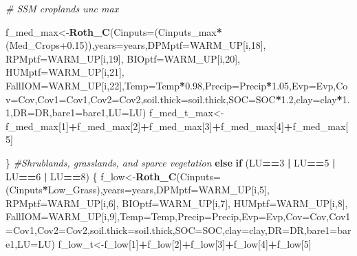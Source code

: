 \documentclass[
  10pt,
  b5paper,
]{book}
\newenvironment{Shaded}{\begin{snugshade}}{\end{snugshade}}
\newcommand{\CommentTok}[1]{\textcolor[rgb]{0.56,0.35,0.01}{\textit{#1}}}
\newcommand{\ControlFlowTok}[1]{\textcolor[rgb]{0.13,0.29,0.53}{\textbf{#1}}}
\newcommand{\DataTypeTok}[1]{\textcolor[rgb]{0.13,0.29,0.53}{#1}}
\newcommand{\DecValTok}[1]{\textcolor[rgb]{0.00,0.00,0.81}{#1}}
\newcommand{\FloatTok}[1]{\textcolor[rgb]{0.00,0.00,0.81}{#1}}
\newcommand{\KeywordTok}[1]{\textcolor[rgb]{0.13,0.29,0.53}{\textbf{#1}}}
\newcommand{\NormalTok}[1]{#1}
\newcommand{\OperatorTok}[1]{\textcolor[rgb]{0.81,0.36,0.00}{\textbf{#1}}}
\newcommand{\StringTok}[1]{\textcolor[rgb]{0.31,0.60,0.02}{#1}}
\begin{document}
\begin{Shaded}
\begin{Highlighting}[]
\CommentTok{# SSM croplands unc max}

\NormalTok{f_med_max<-}\KeywordTok{Roth_C}\NormalTok{(}\DataTypeTok{Cinputs=}\NormalTok{(Cinputs_max}\OperatorTok{*}\NormalTok{(Med_Crops}\FloatTok{+0.15}\NormalTok{)),}\DataTypeTok{years=}\NormalTok{years,}\DataTypeTok{DPMptf=}\NormalTok{WARM_UP[i,}\DecValTok{18}\NormalTok{], }\DataTypeTok{RPMptf=}\NormalTok{WARM_UP[i,}\DecValTok{19}\NormalTok{], }\DataTypeTok{BIOptf=}\NormalTok{WARM_UP[i,}\DecValTok{20}\NormalTok{], }\DataTypeTok{HUMptf=}\NormalTok{WARM_UP[i,}\DecValTok{21}\NormalTok{], }\DataTypeTok{FallIOM=}\NormalTok{WARM_UP[i,}\DecValTok{22}\NormalTok{],}\DataTypeTok{Temp=}\NormalTok{Temp}\OperatorTok{*}\FloatTok{0.98}\NormalTok{,}\DataTypeTok{Precip=}\NormalTok{Precip}\OperatorTok{*}\FloatTok{1.05}\NormalTok{,}\DataTypeTok{Evp=}\NormalTok{Evp,}\DataTypeTok{Cov=}\NormalTok{Cov,}\DataTypeTok{Cov1=}\NormalTok{Cov1,}\DataTypeTok{Cov2=}\NormalTok{Cov2,}\DataTypeTok{soil.thick=}\NormalTok{soil.thick,}\DataTypeTok{SOC=}\NormalTok{SOC}\OperatorTok{*}\FloatTok{1.2}\NormalTok{,}\DataTypeTok{clay=}\NormalTok{clay}\OperatorTok{*}\FloatTok{1.1}\NormalTok{,}\DataTypeTok{DR=}\NormalTok{DR,}\DataTypeTok{bare1=}\NormalTok{bare1,}\DataTypeTok{LU=}\NormalTok{LU)}
\NormalTok{f_med_t_max<-f_med_max[}\DecValTok{1}\NormalTok{]}\OperatorTok{+}\NormalTok{f_med_max[}\DecValTok{2}\NormalTok{]}\OperatorTok{+}\NormalTok{f_med_max[}\DecValTok{3}\NormalTok{]}\OperatorTok{+}\NormalTok{f_med_max[}\DecValTok{4}\NormalTok{]}\OperatorTok{+}\NormalTok{f_med_max[}\DecValTok{5}\NormalTok{]}

\NormalTok{\}}
\CommentTok{#Shrublands, grasslands, and sparce vegetation}
\ControlFlowTok{else} \ControlFlowTok{if}\NormalTok{ (LU}\OperatorTok{==}\DecValTok{3} \OperatorTok{|}\StringTok{ }\NormalTok{LU}\OperatorTok{==}\DecValTok{5} \OperatorTok{|}\StringTok{ }\NormalTok{LU}\OperatorTok{==}\DecValTok{6} \OperatorTok{|}\StringTok{ }\NormalTok{LU}\OperatorTok{==}\DecValTok{8}\NormalTok{) \{}
\NormalTok{f_low<-}\KeywordTok{Roth_C}\NormalTok{(}\DataTypeTok{Cinputs=}\NormalTok{(Cinputs}\OperatorTok{*}\NormalTok{Low_Grass),}\DataTypeTok{years=}\NormalTok{years,}\DataTypeTok{DPMptf=}\NormalTok{WARM_UP[i,}\DecValTok{5}\NormalTok{], }\DataTypeTok{RPMptf=}\NormalTok{WARM_UP[i,}\DecValTok{6}\NormalTok{], }\DataTypeTok{BIOptf=}\NormalTok{WARM_UP[i,}\DecValTok{7}\NormalTok{], }\DataTypeTok{HUMptf=}\NormalTok{WARM_UP[i,}\DecValTok{8}\NormalTok{], }\DataTypeTok{FallIOM=}\NormalTok{WARM_UP[i,}\DecValTok{9}\NormalTok{],}\DataTypeTok{Temp=}\NormalTok{Temp,}\DataTypeTok{Precip=}\NormalTok{Precip,}\DataTypeTok{Evp=}\NormalTok{Evp,}\DataTypeTok{Cov=}\NormalTok{Cov,}\DataTypeTok{Cov1=}\NormalTok{Cov1,}\DataTypeTok{Cov2=}\NormalTok{Cov2,}\DataTypeTok{soil.thick=}\NormalTok{soil.thick,}\DataTypeTok{SOC=}\NormalTok{SOC,}\DataTypeTok{clay=}\NormalTok{clay,}\DataTypeTok{DR=}\NormalTok{DR,}\DataTypeTok{bare1=}\NormalTok{bare1,}\DataTypeTok{LU=}\NormalTok{LU)}
\NormalTok{f_low_t<-f_low[}\DecValTok{1}\NormalTok{]}\OperatorTok{+}\NormalTok{f_low[}\DecValTok{2}\NormalTok{]}\OperatorTok{+}\NormalTok{f_low[}\DecValTok{3}\NormalTok{]}\OperatorTok{+}\NormalTok{f_low[}\DecValTok{4}\NormalTok{]}\OperatorTok{+}\NormalTok{f_low[}\DecValTok{5}\NormalTok{]}


\end{Highlighting}
\end{Shaded}
\end{document}
